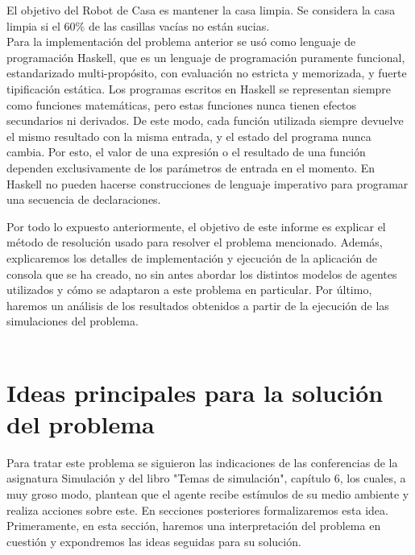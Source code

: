 \documentclass[twoside]{article}
\begin{document}
El objetivo del Robot de Casa es mantener la casa limpia. Se considera la casa limpia si el 60\% de las casillas vac\'ias no est\'an sucias.\\

Para la implementaci\'on del problema anterior se us\'o como lenguaje de programaci\'on Haskell, que es un lenguaje de programaci\'on puramente funcional, estandarizado multi-prop\'osito, con evaluaci\'on no estricta y memorizada, y fuerte tipificaci\'on est\'atica. Los programas escritos en Haskell se representan siempre como funciones matem\'aticas, pero estas funciones nunca tienen efectos secundarios ni derivados. De este modo, cada funci\'on utilizada siempre devuelve el mismo resultado con la misma entrada, y el estado del programa nunca cambia. Por esto, el valor de una expresi\'on o el resultado de una funci\'on dependen exclusivamente de los par\'ametros de entrada en el momento. En Haskell no pueden hacerse construcciones de lenguaje imperativo para programar una secuencia de declaraciones.

Por todo lo expuesto anteriormente, el objetivo de este informe es explicar el m\'etodo de resoluci\'on usado para resolver el problema mencionado. Adem\'as, explicaremos los detalles de implementaci\'on y ejecuci\'on de la aplicaci\'on de consola que se ha creado, no sin antes abordar los distintos modelos de agentes utilizados y c\'omo se adaptaron a este problema en particular. Por \'ultimo, haremos un an\'alisis de los resultados obtenidos a partir de la ejecuci\'on de las simulaciones del problema.\\\\


\section{Ideas principales para la soluci\'on del problema}
Para tratar este problema se siguieron las indicaciones de las conferencias de la asignatura Simulaci\'on y del libro "Temas de simulaci\'on", cap\'itulo 6, los cuales, a muy groso modo, plantean que el agente recibe est\'imulos de su medio ambiente y realiza acciones sobre este. En secciones posteriores formalizaremos esta idea. Primeramente, en esta secci\'on, haremos una interpretaci\'on del problema en cuesti\'on y expondremos las ideas seguidas para su soluci\'on.
\end{document}
